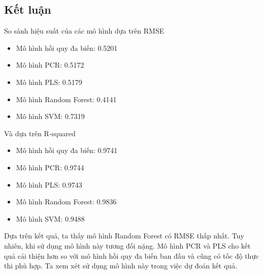 \subsection{Kết luận}

So sánh hiệu suất của các mô hình dựa trên RMSE
\begin{itemize}
    \item Mô hình hồi quy đa biến: 0.5201
    \item Mô hình PCR: 0.5172
    \item Mô hình PLS: 0.5179
    \item Mô hình Random Forest: 0.4141
    \item Mô hình SVM: 0.7319
\end{itemize}

Và dựa trên R-squared
\begin{itemize}
    \item Mô hình hồi quy đa biến: 0.9741
    \item Mô hình PCR: 0.9744
    \item Mô hình PLS: 0.9743
    \item Mô hình Random Forest:  0.9836
    \item Mô hình SVM: 0.9488
\end{itemize}

Dựa trên kết quả, ta thấy mô hình Random Forest có RMSE thấp nhất. Tuy nhiên, khi sử dụng mô hình này tương đối nặng. Mô hình PCR và PLS cho kết quả cải thiện hơn so với mô hình hồi quy đa biến ban đầu và cũng có tốc độ thực thi phù hợp. Ta xem xét sử dụng mô hình này trong việc dự đoán kết quả.